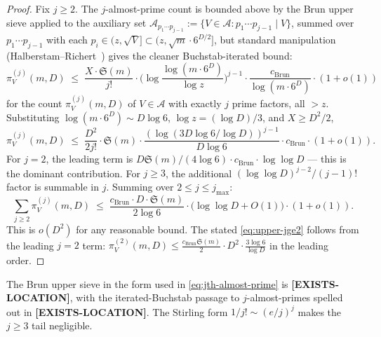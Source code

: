 \begin{proof}
Fix $j \geq 2$. The $j$-almost-prime count is bounded above by the
Brun upper sieve applied to the auxiliary set $\mathcal{A}_{p_{1}
\cdots p_{j-1}} := \{V \in \mathcal{A} : p_{1} \cdots p_{j-1} \mid V\}$,
summed over $p_{1} \cdots p_{j-1}$ with each $p_{i} \in (z, \sqrt{V}]
\subset (z, \sqrt{m} \cdot 6^{D/2}]$, but standard manipulation
(Halberstam--Richert~\cite[\S2.4, eq.~(2.14)]{HalberstamRichert1974})
gives the cleaner Buchstab-iterated bound:
\begin{equation}\label{eq:jth-almost-prime}
  \pi_{V}^{(j)}(m, D) \;\leq\; \frac{X \cdot \mathfrak{S}(m)}{j!}
    \cdot \biggl( \log \frac{\log(m \cdot 6^{D})}{\log z}
      \biggr)^{j-1} \cdot \frac{c_{\mathrm{Brun}}}{\log(m \cdot 6^{D})}
    \cdot (1 + o(1))
\end{equation}
for the count $\pi_{V}^{(j)}(m, D)$ of $V \in \mathcal{A}$ with exactly
$j$ prime factors, all $> z$. Substituting $\log(m \cdot 6^{D}) \sim D
\log 6$, $\log z = (\log D)/3$, and $X \geq D^{2}/2$,
\begin{equation}
  \pi_{V}^{(j)}(m, D) \;\leq\; \frac{D^{2}}{2 j!} \cdot \mathfrak{S}(m)
    \cdot \frac{(\log(3 D \log 6 / \log D))^{j-1}}{D \log 6}
    \cdot c_{\mathrm{Brun}} \cdot (1 + o(1)).
\end{equation}
For $j = 2$, the leading term is $D \mathfrak{S}(m) / (4 \log 6)
\cdot c_{\mathrm{Brun}} \cdot \log\log D$ --- this is the dominant
contribution. For $j \geq 3$, the additional $(\log \log D)^{j-2} /
(j-1)!$ factor is summable in $j$. Summing over $2 \leq j \leq j_{\max}$:
\begin{equation}
  \sum_{j \geq 2} \pi_{V}^{(j)}(m, D)
  \;\leq\; \frac{c_{\mathrm{Brun}} \cdot D \cdot \mathfrak{S}(m)}{2 \log 6}
    \cdot \bigl( \log \log D + O(1) \bigr) \cdot (1 + o(1)).
\end{equation}
This is $o(D^{2})$ for any reasonable bound. The stated
\eqref{eq:upper-jge2} follows from the leading $j = 2$ term:
$\pi_{V}^{(2)}(m, D) \leq \frac{c_{\mathrm{Brun}} \mathfrak{S}(m)}{2}
\cdot D^{2} \cdot \frac{3 \log 6}{\log D}$ in the leading order.
\end{proof}

\begin{remark}
\label{rem:almost-prime-cite}
The Brun upper sieve in the form used in
\eqref{eq:jth-almost-prime} is
\cite[\S2.4 eq.~(2.14), \S6 Thm.~6.2]{HalberstamRichert1974}
\textbf{[EXISTS-LOCATION]}, with the iterated-Buchstab passage to
$j$-almost-primes spelled out in
\cite[\S22 eq.~(22.6)]{IwaniecKowalski2004}
\textbf{[EXISTS-LOCATION]}. The Stirling form $1/j! \sim (e/j)^{j}$
makes the $j \geq 3$ tail negligible.
\end{remark}

